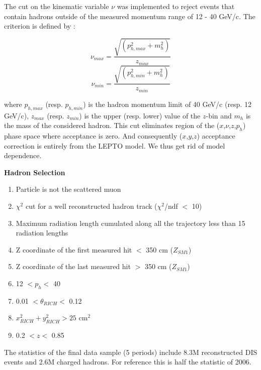 \documentclass[letterpaper,12pt]{article}
\begin{document}
The cut on the kinematic variable $\nu$ was implemented to reject events that contain hadrons outside of the measured
momentum range of 12 - 40 GeV/c. The criterion is defined by :

\begin{equation}
  \nu_{max} = \frac{\sqrt{(p^2_{h,max}+m^2_h)}}{z_{max}}
\end{equation}
\begin{equation}
  \nu_{min} = \frac{\sqrt{(p^2_{h,min}+m^2_h)}}{z_{min}}
\end{equation}

where $p_{h,max}$ (resp. $p_{h,min}$) is the hadron momentum limit of 40 GeV/c (resp. 12 GeV/c), $z_{max}$ (resp. $z_{min}$)
is the upper (resp. lower) value of the $z$-bin and $m_h$ is the mass of the considered hadron.
This cut eliminates region of the ($x$,$\nu$,$z$,$p_{h}$) phase space where acceptance is zero. And consequently ($x$,$y$,$z$) acceptance correction is entirely from the LEPTO model. We thus get rid of model dependence.

\hfill
\newline

\textbf{Hadron Selection}
\begin{enumerate}
	\item Particle is not the scattered muon
	\item $\chi^2$ cut for a well reconstructed hadron track ($\chi^2$/ndf $<$ 10)
	\item Maximum radiation length cumulated along all the trajectory less than 15 radiation lengths
	\item Z coordinate of the first measured hit $<$ 350 cm ($Z_{SM1}$)
	\item Z coordinate of the last measured hit $>$ 350 cm ($Z_{SM1}$)
	\item 12 $< p_h <$ 40
	\item 0.01 $< \theta_{RICH} <$ 0.12
	\item $x^2_{RICH}+y^2_{RICH}>25$ cm$^2$
	\item 0.2 $< z <$ 0.85
\end{enumerate}

The statistics of the final data sample (5 periods) include 8.3M reconstructed DIS events and 2.6M charged hadrons.
For reference this is half the statistic of 2006.
\end{document}
